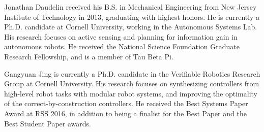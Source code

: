 \documentclass[journal]{IEEEtran}
\begin{document}



%
\newcommand{\biovspace}{-1.5cm}
%
\vspace{\biovspace}
\begin{IEEEbiography}
{Jonathan Daudelin}
received his B.S. in Mechanical Engineering from New Jersey Institute of Technology in 2013, graduating with highest honors. He is currently a Ph.D. candidate at Cornell University, working in the Autonomous Systems Lab. His research focuses on active sensing and planning for information gain in autonomous robots. He received the National Science Foundation Graduate Research Fellowship, and is a member of Tau Beta Pi.
\end{IEEEbiography}
\vspace{\biovspace}
%
\begin{IEEEbiography}
{Gangyuan Jing}
is currently a Ph.D. candidate in the Verifiable Robotics Research Group at Cornell University. His research focuses on synthesizing controllers from high-level robot tasks with modular robot systems, and improving the optimality of the correct-by-construction controllers. He received the Best Systems Paper Award at RSS 2016, in addition to being a finalist for the Best Paper and the Best Student Paper awards.
\end{IEEEbiography}
\end{document}
